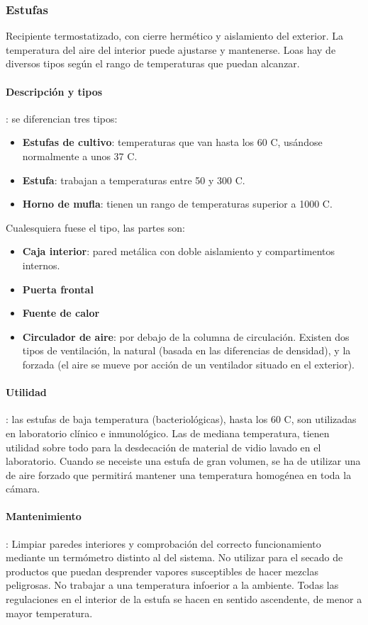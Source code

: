 \subsubsection{Estufas}
Recipiente termostatizado, con cierre hermético y aislamiento del exterior. La temperatura del aire del interior puede ajustarse y mantenerse. Loas hay de diversos tipos según el rango de temperaturas que puedan alcanzar.
\paragraph{Descripción y tipos}: se diferencian tres tipos:
\begin{itemize}[itemsep=0pt,parsep=0pt,topsep=0pt,partopsep=0pt]
    \item \textbf{Estufas de cultivo}: temperaturas que van hasta los 60 C, usándose normalmente a unos 37 C.
    \item\textbf{Estufa}: trabajan a temperaturas entre 50 y 300 C.
    \item\textbf{Horno de mufla}: tienen un rango de temperaturas superior a 1000 C.
\end{itemize}
Cualesquiera fuese el tipo, las partes son:
\begin{itemize}[itemsep=0pt,parsep=0pt,topsep=0pt,partopsep=0pt]
    \item \textbf{Caja interior}: pared metálica con doble aislamiento y compartimentos internos.
    \item\textbf{Puerta frontal}
    \item\textbf{Fuente de calor}
    \item\textbf{Circulador de aire}: por debajo de la columna de circulación. Existen dos tipos de ventilación, la natural (basada en las diferencias de densidad), y la forzada (el aire se mueve por acción de un ventilador situado en el exterior).
\end{itemize} 
\paragraph{Utilidad}: las estufas de baja temperatura (bacteriológicas), hasta los 60 C, son utilizadas en laboratorio clínico e inmunológico. Las de mediana temperatura, tienen utilidad sobre todo para la desdecación de material de vidio lavado en el laboratorio. Cuando se neceiste una estufa de gran volumen, se ha de utilizar una de aire forzado que permitirá mantener una temperatura homogénea en toda la cámara.
\paragraph{Mantenimiento}: Limpiar paredes interiores y comprobación del correcto funcionamiento mediante un termómetro distinto al del sistema. No utilizar para el secado de productos que puedan desprender vapores susceptibles de hacer mezclas peligrosas. No trabajar a una temperatura infoerior a la ambiente. Todas las regulaciones en el interior de la estufa se hacen en sentido ascendente, de menor a mayor temperatura.
